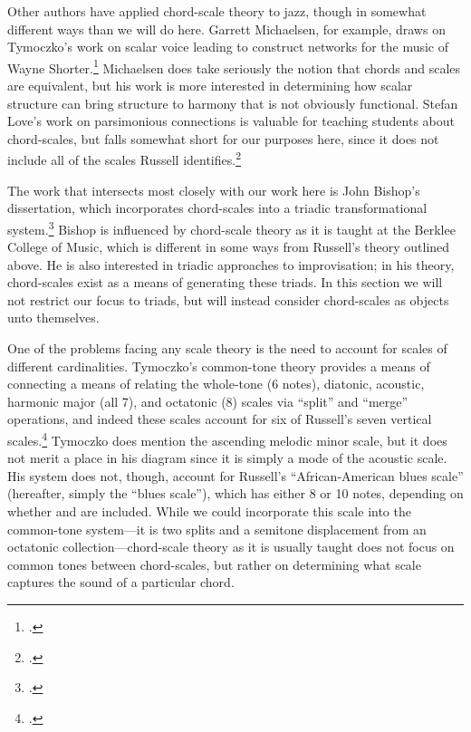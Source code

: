 Other authors have applied chord-scale theory to jazz, though in somewhat
different ways than we will do here. Garrett Michaelsen, for example, draws on
Tymoczko's work on scalar voice leading to construct networks for the music of
Wayne Shorter.\footcite{michaelsen:2012} Michaelsen does take seriously the
notion that chords and scales are equivalent, but his work is more interested
in determining how scalar structure can bring structure to harmony that is not
obviously functional. Stefan Love's work on parsimonious connections is
valuable for teaching students about chord-scales, but falls somewhat short
for our purposes here, since it does not include all of the scales Russell
identifies.\footcite{love:2009}

The work that intersects most closely with our work here is John Bishop's
dissertation, which incorporates chord-scales into a triadic transformational
system.\footcite{bishop:2012} Bishop is influenced by chord-scale theory as
it is taught at the Berklee College of Music, which is different in some ways
from Russell's theory outlined above. He is also interested in
triadic approaches to improvisation; in his theory, chord-scales exist as a
means of generating these triads. In this section we will not
restrict our focus to triads, but will instead consider chord-scales as
objects unto themselves.

One of the problems facing any scale theory is the need to account for scales
of different cardinalities. Tymoczko's common-tone theory provides a means of
connecting a means of relating the whole-tone (6 notes), diatonic, acoustic,
harmonic major (all 7), and octatonic (8) scales via ``split'' and ``merge''
operations, and indeed these scales account for six of Russell's seven
vertical scales.\footcite[134--35]{tymoczko:2011} Tymoczko does mention the
ascending melodic minor scale, but it does not merit a place in his diagram
since it is simply a mode of the acoustic scale. His system does not, though,
account for Russell's ``African-American blues scale'' (hereafter,
simply the ``blues scale''), which has either 8 or 10 notes, depending on
whether  and \nat{} are included. While we could incorporate this scale into
the common-tone system---it is two splits and a semitone displacement from an
octatonic collection---chord-scale theory as it is usually taught does not
focus on common tones between chord-scales, but rather on determining what
scale captures the sound of a particular chord.

